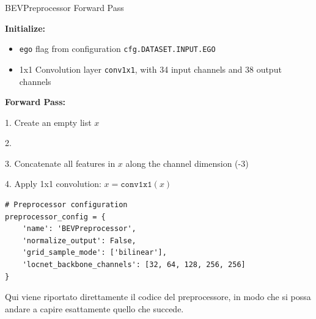 \begin{algorithm}[H]
\caption{BEVPreprocessor Forward Pass}


\BlankLine
\textbf{Initialize:} 
\begin{itemize}
  \item \texttt{ego} flag from configuration \texttt{cfg.DATASET.INPUT.EGO}
  \item 1x1 Convolution layer \texttt{conv1x1}, with 34 input channels and 38 output channels
\end{itemize}

\BlankLine
\textbf{Forward Pass:}

1. Create an empty list $x$

2. 

3. Concatenate all features in $x$ along the channel dimension (-3)

4. Apply 1x1 convolution: $x = \texttt{conv1x1}(x)$

\BlankLine
{}

\end{algorithm}


\begin{verbatim}
# Preprocessor configuration
preprocessor_config = {
    'name': 'BEVPreprocessor',
    'normalize_output': False,
    'grid_sample_mode': ['bilinear'],
    'locnet_backbone_channels': [32, 64, 128, 256, 256]
}
\end{verbatim}

Qui viene riportato direttamente il codice del preprocessore, in modo che si possa andare a capire esattamente quello che succede. 


